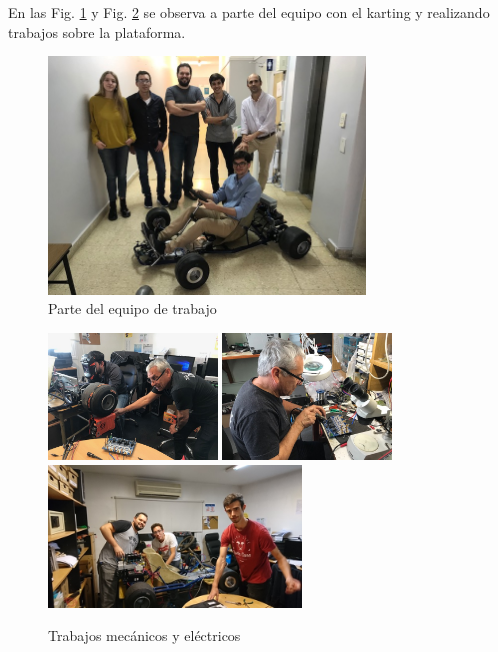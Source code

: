\documentclass[a4]{article}
\begin{document}
En las Fig. \ref{fig:equipo1} y Fig. \ref{fig:equipo2} se observa a parte del equipo con el karting y realizando trabajos sobre la plataforma.
%
\begin{figure}[h]
    \centering
    \includegraphics[width=0.75\textwidth]{figs/equipo1.jpg}
    \caption{Parte del equipo de trabajo}
    \label{fig:equipo1}
\end{figure}
%
\begin{figure}[h]
    \centering
    \includegraphics[width=0.4\textwidth]{figs/equipo2.jpg}
    \includegraphics[width=0.4\textwidth]{figs/equipo3.jpg}
    \includegraphics[width=0.6\textwidth]{figs/equipo4.jpg}
    \caption{Trabajos mecánicos y eléctricos}
    \label{fig:equipo2}
\end{figure}
\end{document}
